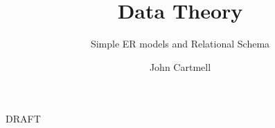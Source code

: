 \documentclass[10pt,a4paper]{scrartcl}
\begin{document}
\title{Data Theory}
\subtitle{Simple ER models and Relational Schema}
\author{John Cartmell}
\maketitle
\begin{center}
DRAFT
\end{center}




%





%
 
%
	 
\end{document}
